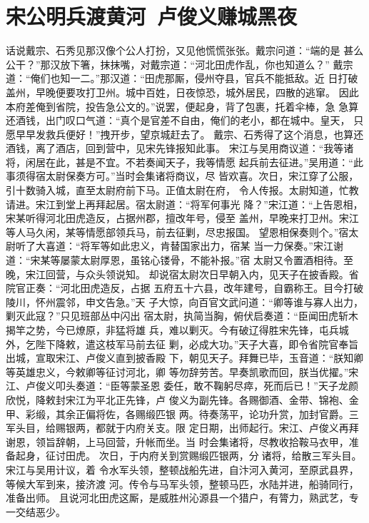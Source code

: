 \chapter{宋公明兵渡黄河~卢俊义赚城黑夜}

话说戴宗、石秀见那汉像个公人打扮，又见他慌慌张张。戴宗问道：“端的是
甚么公干？”那汉放下箸，抹抹嘴，对戴宗道：“河北田虎作乱，你也知道么？”
戴宗道：“俺们也知一二。”那汉道：“田虎那厮，侵州夺县，官兵不能抵敌。近
日打破盖州，早晚便要攻打卫州。城中百姓，日夜惊恐，城外居民，四散的逃窜。
因此本府差俺到省院，投告急公文的。”说罢，便起身，背了包裹，托着伞棒，急
急算还酒钱，出门叹口气道：“真个是官差不自由，俺们的老小，都在城中。皇天，
只愿早早发救兵便好！”拽开步，望京城赶去了。
戴宗、石秀得了这个消息，也算还酒钱，离了酒店，回到营中，见宋先锋报知此事。
宋江与吴用商议道：“我等诸将，闲居在此，甚是不宜。不若奏闻天子，我等情愿
起兵前去征进。”吴用道：“此事须得宿太尉保奏方可。”当时会集诸将商议，尽
皆欢喜。次日，宋江穿了公服，引十数骑入城，直至太尉府前下马。正值太尉在府，
令人传报。太尉知道，忙教请进。宋江到堂上再拜起居。宿太尉道：“将军何事光
降？”宋江道：“上告恩相，宋某听得河北田虎造反，占据州郡，擅改年号，侵至
盖州，早晚来打卫州。宋江等人马久闲，某等情愿部领兵马，前去征剿，尽忠报国。
望恩相保奏则个。”宿太尉听了大喜道：“将军等如此忠义，肯替国家出力，宿某
当一力保奏。”宋江谢道：“宋某等屡蒙太尉厚恩，虽铭心镂骨，不能补报。”宿
太尉又令置酒相待。至晚，宋江回营，与众头领说知。
却说宿太尉次日早朝入内，见天子在披香殿。省院官正奏：“河北田虎造反，占据
五府五十六县，改年建号，自霸称王。目今打破陵川，怀州震邻，申文告急。”天
子大惊，向百官文武问道：“卿等谁与寡人出力，剿灭此寇？”只见班部丛中闪出
宿太尉，执简当胸，俯伏启奏道：“臣闻田虎斩木揭竿之势，今已燎原，非猛将雄
兵，难以剿灭。今有破辽得胜宋先锋，屯兵城外，乞陛下降敕，遣这枝军马前去征
剿，必成大功。”天子大喜，即令省院官奉旨出城，宣取宋江、卢俊义直到披香殿
下，朝见天子。拜舞已毕，玉音道：“朕知卿等英雄忠义，今敕卿等征讨河北，卿
等勿辞劳苦。早奏凯歌而回，朕当优擢。”宋江、卢俊义叩头奏道：“臣等蒙圣恩
委任，敢不鞠躬尽瘁，死而后已！”天子龙颜欣悦，降敕封宋江为平北正先锋，卢
俊义为副先锋。各赐御酒、金带、锦袍、金甲、彩缎，其余正偏将佐，各赐缎匹银
两。待奏荡平，论功升赏，加封官爵。三军头目，给赐银两，都就于内府关支。限
定日期，出师起行。宋江、卢俊义再拜谢恩，领旨辞朝，上马回营，升帐而坐。当
时会集诸将，尽教收拾鞍马衣甲，准备起身，征讨田虎。
次日，于内府关到赏赐缎匹银两，分诸将，给散三军头目。宋江与吴用计议，着
令水军头领，整顿战船先进，自汴河入黄河，至原武县界，等候大军到来，接济渡
河。传令与马军头领，整顿马匹，水陆并进，船骑同行，准备出师。
且说河北田虎这厮，是威胜州沁源县一个猎户，有膂力，熟武艺，专一交结恶少。
